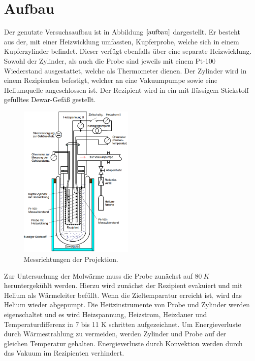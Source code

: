 \section{Aufbau}
Der genutzte Versuchsaufbau ist in Abbildung $\ref{aufbau}$ dargestellt. Er besteht aus der, mit einer Heizwicklung umfassten, Kupferprobe, welche sich in einem Kupferzylinder befindet. Dieser verfügt ebenfalls über eine
separate Heizwicklung. Sowohl der Zylinder, als auch die Probe sind jeweils mit einem Pt-100 Wiederstand ausgestattet, welche als Thermometer dienen. Der Zylinder wird in einem Rezipienten befestigt, welcher an eine
Vakuumpumpe sowie eine Heliumquelle angeschlossen ist. Der Rezipient wird in ein mit flüssigem Stickstoff gefülltes Dewar-Gefäß gestellt.

\begin{figure}[H]
  \centering
  \includegraphics[width=0.5\textwidth]{Bilder/aufbau.png}
  \caption{Messrichtungen der Projektion.}
  \label{aufbau}
\end{figure}
\clearpage
Zur Untersuchung der Molwärme muss die Probe zunächst auf $\SI{80}{K}$ heruntergekühlt werden. Hierzu wird zunächst der Rezipient evakuiert und mit Helium als Wärmeleiter befüllt. Wenn die Zieltemparatur erreicht ist, wird das Helium wieder
abgepumpt. Die Heitzinstrumente von Probe und Zylinder werden eigenschaltet und es wird Heizspannung, Heizstrom, Heizdauer und Temperaturdifferenz in 7 bis 11 K schritten aufgezeichnet. Um Energieverluste durch
Wärmestrahlung zu vermeiden, werden Zylinder und Probe auf der gleichen Temperatur gehalten. Energieverluste durch Konvektion werden durch das Vakuum im Rezipienten verhindert.
